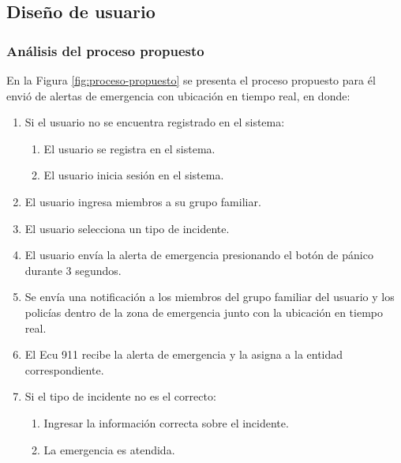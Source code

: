 \subsection{Diseño de usuario}

\subsubsection{Análisis del proceso propuesto}

En la Figura \ref{fig:proceso-propuesto} se presenta el proceso propuesto para él envió de alertas de emergencia con
ubicación en tiempo real, en donde:

\begin{enumerate}
    \item Si el usuario no se encuentra registrado en el sistema:
          \begin{enumerate}
              \item El usuario se registra en el sistema.
              \item El usuario inicia sesión en el sistema.
          \end{enumerate}
    \item El usuario ingresa miembros a su grupo familiar.
    \item El usuario selecciona un tipo de incidente.
    \item El usuario envía la alerta de emergencia presionando el botón de pánico durante 3 segundos.
    \item Se envía una notificación a los miembros del grupo familiar del usuario y los policías dentro de la zona de emergencia junto con la ubicación en tiempo real.
    \item El Ecu 911 recibe la alerta de emergencia y la asigna a la entidad correspondiente.
    \item Si el tipo de incidente no es el correcto:
          \begin{enumerate}
              \item Ingresar la información correcta sobre el incidente.
              \item La emergencia es atendida.
          \end{enumerate}
\end{enumerate}

